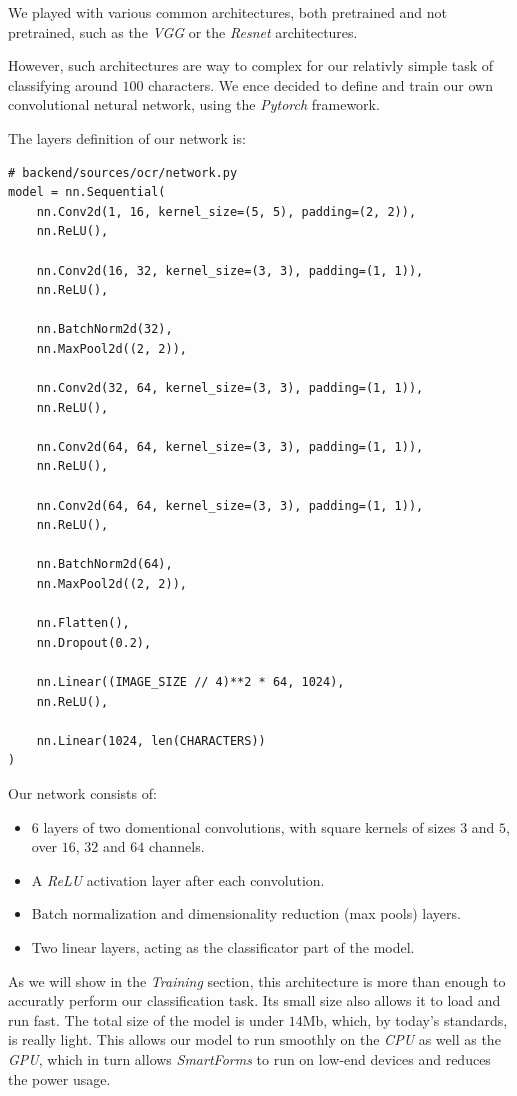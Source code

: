 \documentclass[11pt, a4paper]{report}
\begin{document}
We played with various common architectures, both pretrained and not pretrained, such as the \textit{VGG}\cite{VGG} or the \textit{Resnet}\cite{resnet} architectures.

However, such architectures are way to complex for our relativly simple task of classifying around $100$ characters. We ence decided to define and train our own convolutional netural network, using the \textit{Pytorch} framework.

The layers definition of our network is:

\begin{verbatim}
# backend/sources/ocr/network.py
model = nn.Sequential(
    nn.Conv2d(1, 16, kernel_size=(5, 5), padding=(2, 2)),
    nn.ReLU(),
    
    nn.Conv2d(16, 32, kernel_size=(3, 3), padding=(1, 1)),
    nn.ReLU(),
    
    nn.BatchNorm2d(32),
    nn.MaxPool2d((2, 2)),
    
    nn.Conv2d(32, 64, kernel_size=(3, 3), padding=(1, 1)),
    nn.ReLU(),
    
    nn.Conv2d(64, 64, kernel_size=(3, 3), padding=(1, 1)),
    nn.ReLU(),
    
    nn.Conv2d(64, 64, kernel_size=(3, 3), padding=(1, 1)),
    nn.ReLU(),

    nn.BatchNorm2d(64),
    nn.MaxPool2d((2, 2)),

    nn.Flatten(),
    nn.Dropout(0.2),

    nn.Linear((IMAGE_SIZE // 4)**2 * 64, 1024),
    nn.ReLU(),

    nn.Linear(1024, len(CHARACTERS))
)
\end{verbatim}

Our network consists of:
\begin{itemize}
	\item $6$ layers of two domentional convolutions, with square kernels of sizes $3$ and $5$, over $16$, $32$ and $64$ channels.
	\item A \textit{ReLU}\cite{ReLU} activation layer after each convolution.
	\item Batch normalization and dimensionality reduction (max pools) layers.
	\item Two linear layers, acting as the classificator part of the model.
\end{itemize}

As we will show in the \textit{Training} section, this architecture is more than enough to accuratly perform our classification task. Its small size also allows it to load and run fast. The total size of the model is under $14$Mb, which, by today's standards, is really light. This allows our model to run smoothly on the \textit{CPU} as well as the \textit{GPU}, which in turn allows \textit{SmartForms} to run on low-end devices and reduces the power usage. 
\end{document}
